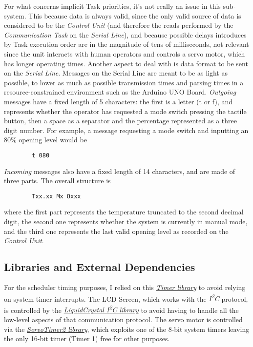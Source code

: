 \documentclass[a4paper,12pt]{report}
\begin{document}
	\newline For what concerns implicit Task priorities, it's not really an issue in this sub-system. This because data is always valid, since the only valid source of data is considered to be the \textit{Control Unit} (and therefore the reads performed by the \textit{Communication Task} on the \textit{Serial Line}), and because possible delays introduces by Task execution order are in the magnitude of tens of milliseconds, not relevant since the unit interacts with human operators and controls a servo motor, which has longer operating times.
	\newline Another aspect to deal with is data format to be sent on the \textit{Serial Line}. Messages on the Serial Line are meant to be as light as possible, to lower as much as possible transmission times and parsing times in a resource-constrained environment such as the Arduino UNO Board.
	\newline \textit{Outgoing} messages have a fixed length of 5 characters: the first is a letter (t or f), and represents whether the operator has requested a mode switch pressing the tactile button, then a space as a separator and the percentage represented as a three digit number. For example, a message requesting a mode switch and inputting an 80\% opening level would be
	\begin{verbatim}
		t 080
	\end{verbatim}
	\textit{Incoming} messages also have a fixed length of 14 characters, and are made of three parts. The overall structure is
	\begin{verbatim}
		Txx.xx Mx Oxxx
	\end{verbatim}
	where the first part represents the temperature truncated to the second decimal digit, the second one represents whether the system is currently in manual mode, and the third one represents the last valid opening level as recorded on the \textit{Control Unit}.
		\subsection{Libraries and External Dependencies}
		For the scheduler timing purposes, I relied on this \href{https://github.com/sstaub/Timer}{\textit{Timer library}} to avoid relying on system timer interrupts.
		\newline The LCD Screen, which works with the \textit{I\textsuperscript{2}C} protocol, is controlled by the \href{https://docs.arduino.cc/libraries/liquidcrystal-i2c/}{\textit{LiquidCrystal I\textsuperscript{2}C library}} to avoid having to handle all the low-level aspects of that communication protocol.
		\newline The servo motor is controlled via the \href{https://github.com/nabontra/ServoTimer2}{\textit{ServoTimer2 library}}, which exploits one of the 8-bit system timers leaving the only 16-bit timer (Timer 1) free for other purposes.
\end{document}
